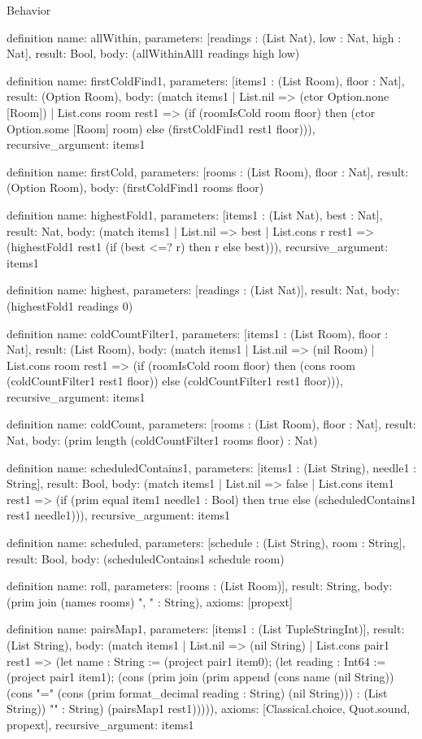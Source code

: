 \begin{lexlean}{Behavior}
\begin{semanticmodule}
definition{
  name: allWithin,
  parameters: [readings : (List Nat), low : Nat, high : Nat],
  result: Bool,
  body: (allWithinAll1 readings high low)
}

definition{
  name: firstColdFind1,
  parameters: [items1 : (List Room), floor : Nat],
  result: (Option Room),
  body: (match items1
    | List.nil => (ctor Option.none [Room])
    | List.cons room rest1 => (if (roomIsCold room floor) then (ctor Option.some [Room] room) else (firstColdFind1 rest1 floor))),
  recursive_argument: items1
}

definition{
  name: firstCold,
  parameters: [rooms : (List Room), floor : Nat],
  result: (Option Room),
  body: (firstColdFind1 rooms floor)
}

definition{
  name: highestFold1,
  parameters: [items1 : (List Nat), best : Nat],
  result: Nat,
  body: (match items1
    | List.nil => best
    | List.cons r rest1 => (highestFold1 rest1 (if (best <=? r) then r else best))),
  recursive_argument: items1
}

definition{
  name: highest,
  parameters: [readings : (List Nat)],
  result: Nat,
  body: (highestFold1 readings 0)
}

definition{
  name: coldCountFilter1,
  parameters: [items1 : (List Room), floor : Nat],
  result: (List Room),
  body: (match items1
    | List.nil => (nil Room)
    | List.cons room rest1 => (if (roomIsCold room floor) then (cons room (coldCountFilter1 rest1 floor)) else (coldCountFilter1 rest1 floor))),
  recursive_argument: items1
}

definition{
  name: coldCount,
  parameters: [rooms : (List Room), floor : Nat],
  result: Nat,
  body: (prim length (coldCountFilter1 rooms floor) : Nat)
}

definition{
  name: scheduledContains1,
  parameters: [items1 : (List String), needle1 : String],
  result: Bool,
  body: (match items1
    | List.nil => false
    | List.cons item1 rest1 => (if (prim equal item1 needle1 : Bool) then true else (scheduledContains1 rest1 needle1))),
  recursive_argument: items1
}

definition{
  name: scheduled,
  parameters: [schedule : (List String), room : String],
  result: Bool,
  body: (scheduledContains1 schedule room)
}

definition{
  name: roll,
  parameters: [rooms : (List Room)],
  result: String,
  body: (prim join (names rooms) ", " : String),
  axioms: [propext]
}

definition{
  name: pairsMap1,
  parameters: [items1 : (List TupleStringInt)],
  result: (List String),
  body: (match items1
    | List.nil => (nil String)
    | List.cons pair1 rest1 => (let name : String := (project pair1 item0); (let reading : Int64 := (project pair1 item1); (cons (prim join (prim append (cons name (nil String)) (cons "=" (cons (prim format_decimal reading : String) (nil String))) : (List String)) "" : String) (pairsMap1 rest1))))),
  axioms: [Classical.choice, Quot.sound, propext],
  recursive_argument: items1
}


\end{semanticmodule}
\end{lexlean}

